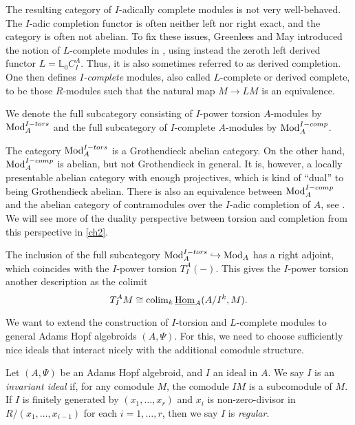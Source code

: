 \begin{remark}
    \label{ch0:rm:I-complete-vs-I-adically-complete}
    The resulting category of $I$-adically complete modules is not very well-behaved. The $I$-adic completion functor is often neither left nor right exact, and the category is often not abelian. To fix these issues, Greenlees and May introduced the notion of $L$-complete modules in \cite{greenlees-may_92}, using instead the zeroth left derived functor $L=\mathbb{L}_0 C_I^A$. Thus, it is also sometimes referred to as derived completion. One then defines \emph{$I$-complete} modules, also called $L$-complete or derived complete, to be those $R$-modules such that the natural map $M\longrightarrow L M$ is an equivalence. 
\end{remark}

\begin{notation}
    We denote the full subcategory consisting of $I$-power torsion $A$-modules by $\mathrm{Mod}_A^{I-tors}$ and the full subcategory of $I$-complete $A$-modules by $\mathrm{Mod}_A^{I-comp}$. 
\end{notation}

\begin{remark}
    The category $\mathrm{Mod}_A^{I-tors}$ is a Grothendieck abelian category. On the other hand, $\mathrm{Mod}_A^{I-comp}$ is abelian, but not Grothendieck in general. It is, however, a locally presentable abelian category with enough projectives, which is kind of ``dual'' to being Grothendieck abelian. There is also an equivalence between $\mathrm{Mod}_A^{I-comp}$ and the abelian category of contramodules over the $I$-adic completion of $A$, see \cite[Section 2.2]{positselski_2022_contramodules}. We will see more of the duality perspective between torsion and completion from this perspective in \cref{ch2}. 
\end{remark}

The inclusion of the full subcategory $\mathrm{Mod}_A^{I-tors}\hookrightarrow \mathrm{Mod}_A$ has a right adjoint, which coincides with the $I$-power torsion $T_I^A(-)$. This gives the $I$-power torsion another description as the colimit 
$$T_I^A M \cong \operatorname{colim}_k \operatorname{\underline{Hom}}_A (A/I^k, M).$$

We want to extend the construction of $I$-torsion and $L$-complete modules to general Adams Hopf algebroids $(A,\Psi)$. For this, we need to choose sufficiently nice ideals that interact nicely with the additional comodule structure. 

\begin{definition}
    Let $(A, \Psi)$ be an Adams Hopf algebroid, and $I$ an ideal in $A$. We say $I$ is an \emph{invariant ideal} if, for any comodule $M$, the comodule $IM$ is a subcomodule of $M$. If $I$ is finitely generated by $(x_1, \ldots, x_r)$ and $x_i$ is non-zero-divisor in $R/(x_1, \ldots, x_{i-1})$ for each $i=1, \ldots, r$, then we say $I$ is \emph{regular}. 
\end{definition}

